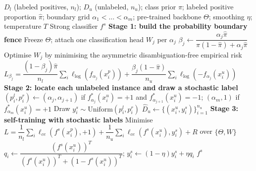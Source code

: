 \documentclass{article}
\begin{document}
\begin{algorithm}[!h]
\renewcommand{\algorithmicrequire}{\textbf{Input:}} %
\renewcommand{\algorithmicensure}{\textbf{Output:}} %
	\caption{PUL-CPBF (controlled probability boundary fence)} %
	\begin{algorithmic}[1] %
	    \REQUIRE
	    $D_{l}$ (labeled positives, $n_{l}$); $D_{u}$ (unlabeled, $n_{u}$);
	    class prior $\pi$; labeled positive proportion $\hat{\pi}$;
	    boundary grid $\alpha_{1}<\dots<\alpha_{m}$; pre-trained backbone $\Theta$;
	    smoothing $\eta$; temperature $T$
	    \ENSURE
	    Strong classifier $f^{s}$
	    \STATE \textbf{Stage 1: build the probability boundary fence}
	    \STATE Freeze $\Theta$; attach one classification head $W_{j}$ per $\alpha_{j}$ %
	    \STATE $\beta_{j}\leftarrow \dfrac{\alpha_{j}\hat{\pi}}{\pi(1-\hat{\pi})+\alpha_{j}\hat{\pi}}$ %
	    \STATE Optimise $W_{j}$ by minimising the asymmetric disambiguation-free empirical risk
	    \STATE \quad $L_{\beta_{j}}=\dfrac{(1-\beta_{j})\hat{\pi}}{n_{l}}\sum_{i}\ell_{\log}(f_{\alpha_{j}}(x_{i}^{p}))
	    +\dfrac{\beta_{j}(1-\hat{\pi})}{n_{u}}\sum_{i}\ell_{\log}(-f_{\alpha_{j}}(x_{i}^{u}))$ %
	    \ENDFOR
	    \STATE \textbf{Stage 2: locate each unlabeled instance and draw a stochastic label}
	    \STATE $(p_{i}^{l},p_{i}^{r})\leftarrow (\alpha_{j},\alpha_{j+1})$ if $f_{\alpha_{j}}^{\ast}(x_{i}^{u})=+1$ and $f_{\alpha_{j+1}}^{\ast}(x_{i}^{u})=-1$;
	    $(\alpha_{m},1)$ if $f_{\alpha_{m}}^{\ast}(x_{i}^{u})=+1$ %
	    \STATE Draw $y_{i}^{s}\sim \mathrm{Uniform}(p_{i}^{l},p_{i}^{r})$
	    \ENDFOR
	    \STATE $\hat{D}_{u}\leftarrow \{(x_{i}^{u},y_{i}^{s})\}_{i=1}^{n_{u}}$
	    \STATE \textbf{Stage 3: self-training with stochastic labels}
	    \STATE Minimise $L=\dfrac{1}{n_{l}}\sum_{i}\ell_{ce}(f^{s}(x_{i}^{p}),+1)
	    +\dfrac{1}{n_{u}}\sum_{i}\ell_{ce}(f^{s}(x_{i}^{u}),y_{i}^{s})+R$ over $\{\Theta,W\}$ %
	    \STATE $q_{i}\leftarrow \dfrac{(f^{s}(x_{i}^{u}))^{T}}{(f^{s}(x_{i}^{u}))^{T}+(1-f^{s}(x_{i}^{u}))^{T}}$;\quad
	    $y_{i}^{s}\leftarrow (1-\eta)y_{i}^{s}+\eta q_{i}$ %
	    \ENDWHILE
		\RETURN $f^{s}$
	\end{algorithmic}
\end{algorithm}
\end{document}
